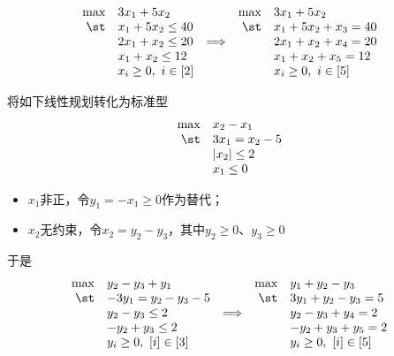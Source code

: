 \documentclass{ctexart}
\begin{document}
\begin{itemize}
          \begin{align}
              \begin{array}{rlcrl} \label{eq: illustration-standard}
                  \max & 3 x_1 + 5 x_2          &                 & \max & 3 x_1 + 5 x_2          \\
                  \st  & x_1 + 5 x_2 \le 40     &                 & \st  & x_1 + 5 x_2 + x_3 = 40 \\
                       & 2 x_1 + x_2 \le 20     & \Longrightarrow &      & 2 x_1 + x_2 + x_4 = 20 \\
                       & x_1 + x_2 \le 12       &                 &      & x_1 + x_2 + x_5 = 12   \\
                       & x_i \ge 0, ~ i \in [2] &                 &      & x_i \ge 0, ~ i \in [5]
              \end{array}
          \end{align}
\end{itemize}

\begin{example}
    将如下线性规划转化为标准型
    \begin{align*}
        \begin{array}{rlcrl}
            \max & x_2 - x_1       \\
            \st  & 3 x_1 = x_2 - 5 \\
                 & |x_2| \le 2     \\
                 & x_1 \le 0
        \end{array}
    \end{align*}
    \begin{itemize}
        \item $x_1$非正，令$y_1 = -x_1 \ge 0$作为替代；
        \item $x_2$无约束，令$x_2 = y_2 - y_3$，其中$y_2 \ge 0 $、$y_3 \ge 0$
    \end{itemize}
    于是
    \begin{align*}
        \begin{array}{rlcrl}
            \max & y_2 - y_3 + y_1          &                 & \max & y_1 + y_2 - y_3          \\
            \st  & -3 y_1 = y_2 - y_3 - 5   &                 & \st  & 3 y_1 + y_2 - y_3 = 5    \\
                 & y_2 - y_3 \le 2          & \Longrightarrow &      & y_2 - y_3 + y_4 = 2      \\
                 & -y_2 + y_3 \le 2         &                 &      & -y_2 + y_3 + y_5 = 2     \\
                 & y_i \ge 0, ~ [i] \in [3] &                 &      & y_i \ge 0, ~ [i] \in [5]
        \end{array}
    \end{align*}
\end{example}
\end{document}
